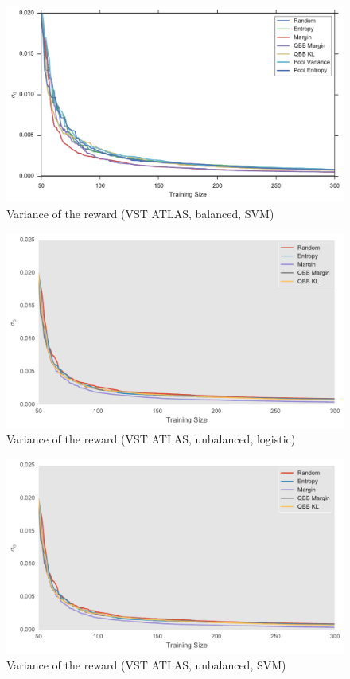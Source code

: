 \begin{figure}[p]
	\centering
	\includegraphics[width=\textwidth]{figures/5_thompson/vstatlas_br_sigmas}
	\caption[Variance of the reward (VST ATLAS, balanced, SVM)]{
		Variance of the reward (VST ATLAS, balanced, SVM)}
	\label{fig:vstatlas_br_sigmas}
\end{figure}

\begin{figure}[p]
	\centering
	\includegraphics[width=\textwidth]{figures/5_thompson/vstatlas_ul_sigmas}
	\caption[Variance of the reward (VST ATLAS, unbalanced, logistic)]{
		Variance of the reward (VST ATLAS, unbalanced, logistic)}
	\label{fig:vstatlas_ul_sigmas}
\end{figure}

\begin{figure}[p]
	\centering
	\includegraphics[width=\textwidth]{figures/5_thompson/vstatlas_ur_sigmas}
	\caption[Variance of the reward (VST ATLAS, unbalanced, SVM)]{
		Variance of the reward (VST ATLAS, unbalanced, SVM)}
	\label{fig:vstatlas_ur_sigmas}
\end{figure}


